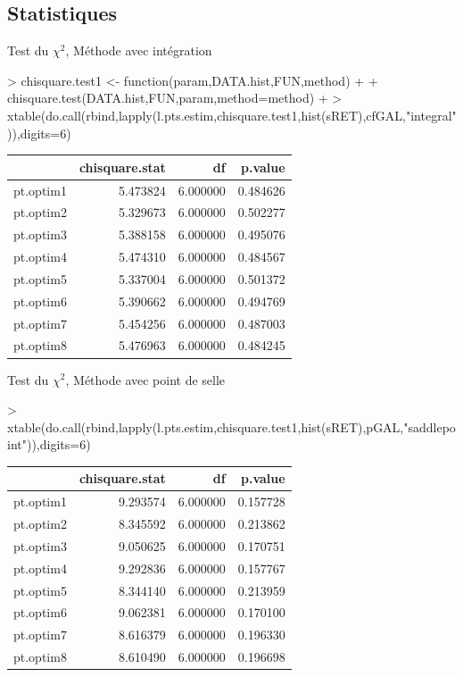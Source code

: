 \documentclass{report}
\begin{document}
\subsection{Statistiques}
Test du $\chi^2$, Méthode avec intégration
\begin{Schunk}
\begin{Sinput}
> chisquare.test1 <- function(param,DATA.hist,FUN,method)
+ {
+ 	chisquare.test(DATA.hist,FUN,param,method=method)
+ }
> xtable(do.call(rbind,lapply(l.pts.estim,chisquare.test1,hist(sRET),cfGAL,"integral")),digits=6)
\end{Sinput}
\begin{table}[ht]
\centering
\begin{tabular}{rrrr}
  \hline
 & chisquare.stat & df & p.value \\ 
  \hline
pt.optim1 & 5.473824 & 6.000000 & 0.484626 \\ 
  pt.optim2 & 5.329673 & 6.000000 & 0.502277 \\ 
  pt.optim3 & 5.388158 & 6.000000 & 0.495076 \\ 
  pt.optim4 & 5.474310 & 6.000000 & 0.484567 \\ 
  pt.optim5 & 5.337004 & 6.000000 & 0.501372 \\ 
  pt.optim6 & 5.390662 & 6.000000 & 0.494769 \\ 
  pt.optim7 & 5.454256 & 6.000000 & 0.487003 \\ 
  pt.optim8 & 5.476963 & 6.000000 & 0.484245 \\ 
   \hline
\end{tabular}
\end{table}\end{Schunk}

Test du $\chi^2$, Méthode avec point de selle
\begin{Schunk}
\begin{Sinput}
> xtable(do.call(rbind,lapply(l.pts.estim,chisquare.test1,hist(sRET),pGAL,"saddlepoint")),digits=6)
\end{Sinput}
\begin{table}[ht]
\centering
\begin{tabular}{rrrr}
  \hline
 & chisquare.stat & df & p.value \\ 
  \hline
pt.optim1 & 9.293574 & 6.000000 & 0.157728 \\ 
  pt.optim2 & 8.345592 & 6.000000 & 0.213862 \\ 
  pt.optim3 & 9.050625 & 6.000000 & 0.170751 \\ 
  pt.optim4 & 9.292836 & 6.000000 & 0.157767 \\ 
  pt.optim5 & 8.344140 & 6.000000 & 0.213959 \\ 
  pt.optim6 & 9.062381 & 6.000000 & 0.170100 \\ 
  pt.optim7 & 8.616379 & 6.000000 & 0.196330 \\ 
  pt.optim8 & 8.610490 & 6.000000 & 0.196698 \\ 
   \hline
\end{tabular}
\end{table}\end{Schunk}
\end{document}
